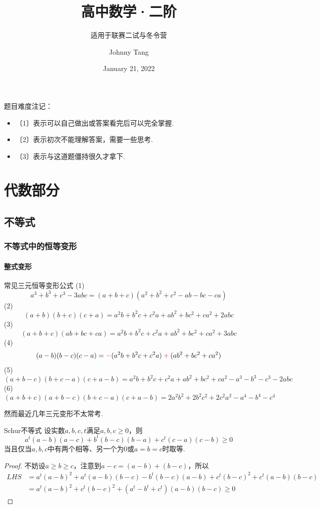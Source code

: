 \documentclass[lang=cn, zihao=4.5]{elegantbook}
\title{高中数学·二阶}
\subtitle{适用于联赛二试与冬令营}
\author{Johnny Tang}
\institute{DEEP Team}
\date{January 21, 2022}
\newcommand{\nd}[1]{〔#1〕}
\begin{document}
\maketitle

\frontmatter

\mainmatter

\tableofcontents

\newpage

题目难度注记：

\begin{itemize}
	\item \nd{1}表示可以自己做出或答案看完后可以完全掌握.
	\item \nd{2}表示初次不能理解答案，需要一些思考.
	\item \nd{3}表示与这道题僵持很久才拿下.
\end{itemize}

\newpage

\part{代数部分}

\chapter{不等式}

\section{不等式中的恒等变形}

\subsection{整式变形}

\begin{proposition}{常见三元恒等变形公式}
	(1)$$a^3+b^3+c^3-3abc = (a+b+c)(a^2+b^2+c^2-ab-bc-ca)$$
	(2)$$(a+b)(b+c)(c+a) = a^2b + b^2c + c^2a + ab^2 + bc^2 + ca^2 +2abc$$
	(3)$$(a+b+c)(ab+bc+ca) = a^2b + b^2c + c^2a + ab^2 + bc^2 + ca^2 +3abc$$
	(4)$$(a-b)(b-c)(c-a) = \color{red}-\color{black}(a^2b+b^2c+c^2a)\color{red}+\color{black}(ab^2+bc^2+ca^2)$$
	(5)$$(a+b-c)(b+c-a)(c+a-b) = a^2b+b^2c+c^2a+ab^2+bc^2+ca^2-a^3-b^3-c^3-2abc$$
	(6)$$(a+b+c)(a+b-c)(b+c-a)(c+a-b) = 2a^2b^2 + 2b^2c^2 + 2c^2a^2 - a^4 -b^4-c^4$$
\end{proposition}

然而最近几年三元变形不太常考.

\begin{theorem}{Schur不等式}
	设实数$a,b,c,t$满足$a,b,c \geq 0$，则$$a^t(a-b)(a-c) + b^t(b-c)(b-a) + c^t(c-a)(c-b) \geq 0$$
	当且仅当$a,b,c$中有两个相等、另一个为$0$或$a=b=c$时取等.
\end{theorem}
\begin{proof}
	不妨设$a \geq b \geq c$，注意到$a-c=(a-b)+(b-c)$，所以
	\begin{align*}
		LHS &= a^t(a-b)^2 + a^t(a-b)(b-c) - b^t(b-c)(a-b) + c^t(b-c)^2 + c^t(a-b)(b-c) \\
		&= a^t(a-b)^2 + c^t(b-c)^2 + (a^t-b^t+c^t)(a-b)(b-c) \geq 0
	\end{align*}
\end{proof}
\end{document}
